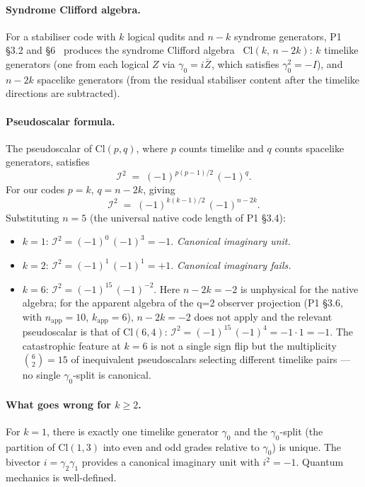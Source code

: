 \documentclass[11pt,a4paper]{article}
\providecommand{\Cl}[1]{\mathrm{Cl}(#1)}
\newcommand{\Lz}[1]{\bar{Z}_{#1}}
\newcommand{\nApp}{n_{\mathrm{app}}}
\newcommand{\kApp}{k_{\mathrm{app}}}
\begin{document}
\paragraph{Syndrome Clifford algebra.}
For a stabiliser code with $k$ logical qudits and $n-k$ syndrome generators, P1 \S3.2 and \S6~\cite{Hubka2026QSD} produces the syndrome Clifford algebra~\cite{Hestenes2003, Lounesto2001} $\Cl{k,\,n-2k}$: $k$ timelike generators (one from each logical $Z$ via $\gamma_0=i\Lz{}$, which satisfies $\gamma_0^2=-I$), and $n-2k$ spacelike generators (from the residual stabiliser content after the timelike directions are subtracted).

\paragraph{Pseudoscalar formula.}
The pseudoscalar of $\Cl{p,q}$, where $p$ counts timelike and $q$ counts spacelike generators, satisfies
\begin{equation}
  \mathcal{I}^2 \;=\; (-1)^{p(p-1)/2}\,(-1)^{q}.
  \label{eq:I2_pq}
\end{equation}
For our codes $p=k$, $q=n-2k$, giving
\begin{equation}
  \mathcal{I}^2 \;=\; (-1)^{k(k-1)/2}\,(-1)^{n-2k}.
  \label{eq:I2_kn}
\end{equation}
Substituting $n=5$ (the universal native code length of P1 \S3.4):
\begin{itemize}\setlength\itemsep{2pt}
  \item $k=1$:\; $\mathcal{I}^2 = (-1)^{0}\,(-1)^{3} = -1$. \emph{Canonical imaginary unit.}
  \item $k=2$:\; $\mathcal{I}^2 = (-1)^{1}\,(-1)^{1} = +1$. \emph{Canonical imaginary fails.}
  \item $k=6$:\; $\mathcal{I}^2 = (-1)^{15}\,(-1)^{-2}$. Here $n-2k=-2$ is unphysical for the native algebra; for the apparent algebra of the q=2 observer projection (P1 \S3.6, with $\nApp=10$, $\kApp=6$), $n-2k=-2$ does not apply and the relevant pseudoscalar is that of $\Cl{6,4}$: $\mathcal{I}^2 = (-1)^{15}\,(-1)^{4} = -1\cdot 1 = -1$. The catastrophic feature at $k=6$ is not a single sign flip but the multiplicity $\binom{6}{2}=15$ of inequivalent pseudoscalars selecting different timelike pairs --- no single $\gamma_0$-split is canonical.
\end{itemize}

\paragraph{What goes wrong for $k\geq 2$.}
For $k=1$, there is exactly one timelike generator $\gamma_0$ and the $\gamma_0$-split (the partition of $\Cl{1,3}$ into even and odd grades relative to $\gamma_0$) is unique. The bivector $i=\gamma_2\gamma_1$ provides a canonical imaginary unit with $i^2=-1$. Quantum mechanics is well-defined.
\end{document}
